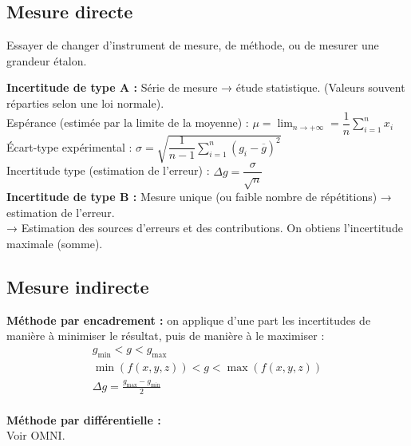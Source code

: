 \documentclass[13pt, twoside, a4paper, french]{report}
\begin{document}
    \begin{minipage}[t]{0.65\textwidth}%
      \subsection{Mesure directe}\label{subsec:mesure-directe}
        
        Essayer de changer d'instrument de mesure, de méthode, ou de mesurer une grandeur étalon.
        
        \textbf{Incertitude de type A :} Série de mesure → étude statistique. (Valeurs souvent réparties selon une loi normale).\\
        Espérance (estimée par la limite de la moyenne) : $\displaystyle \mu = \lim_{n \to +\infty} = \dfrac{1}{n} \sum_{i=1}^{n} x_i$\\
        Écart-type expérimental : $\displaystyle \sigma = \sqrt{\dfrac{1}{n-1} \sum_{i=1}^{n} (g_i - \overline{g})^2}$\\
        Incertitude type (estimation de l'erreur) : $\Delta g = \dfrac{\sigma}{\sqrt{n}}$\\
        
        \textbf{Incertitude de type B :} Mesure unique (ou faible nombre de répétitions) → estimation de l'erreur.\\
        → Estimation des sources d'erreurs et des contributions.
        On obtiens l'incertitude maximale (somme).
    
    \end{minipage}\hspace{0.03\textwidth}
    \begin{minipage}[t]{0.32\textwidth}%
      \subsection{Mesure indirecte}\label{subsec:mesure-indirecte}
        
        \textbf{Méthode par encadrement :} on applique d'une part les incertitudes de manière à minimiser le résultat, puis de manière à le maximiser :
        \begin{gather*}
          g_{\min} < g < g_{\max}\\
          \min(f(x, y, z)) < g < \max(f(x, y, z))\\
          \Delta g = \frac{g_{\max} - g_{\min}}{2}\\
        \end{gather*}
        
        \textbf{Méthode par différentielle :}\\ Voir OMNI.
    
    \end{minipage}
\end{document}
